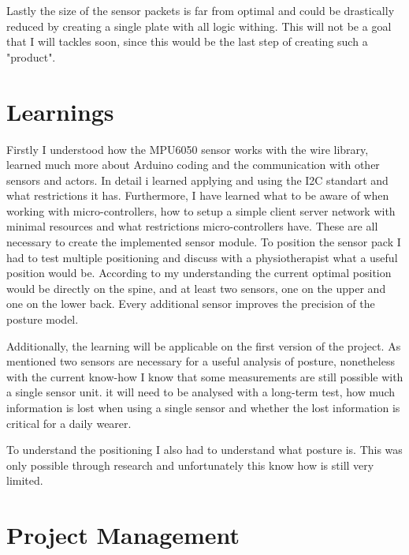 Lastly the size of the sensor packets is far from optimal and could be drastically reduced by creating a single plate with all logic withing. This will not be a goal that I will tackles soon, since this would be the last step of creating such a "product".


\section{Learnings}

Firstly I understood how the MPU6050 sensor works with the wire library, learned much more about Arduino coding and the communication with other sensors and actors. In detail i learned applying and using the I2C standart and what restrictions it has.
Furthermore, I have learned what to be aware of when working with micro-controllers, how to setup a simple client server network with minimal resources and what restrictions micro-controllers have. These are all necessary to create the implemented sensor module. 
To position the sensor pack I had to test multiple positioning and discuss with a physiotherapist what a useful position would be. According to my understanding the current optimal position would be directly on the spine, and at least two sensors, one on the upper and one on the lower back. Every additional sensor improves the precision of the posture model. 

Additionally, the learning will be applicable on the first version of the project. As mentioned two sensors are necessary for a useful analysis of posture, nonetheless with the current know-how I know that some measurements are still possible with a single sensor unit. it will need to be analysed with a long-term test, how much information is lost when using a single sensor and whether the lost information is critical for a daily wearer.

To understand the positioning I also had to understand what posture is. This was only possible through research and unfortunately this know how is still very limited.

\section{Project Management}

